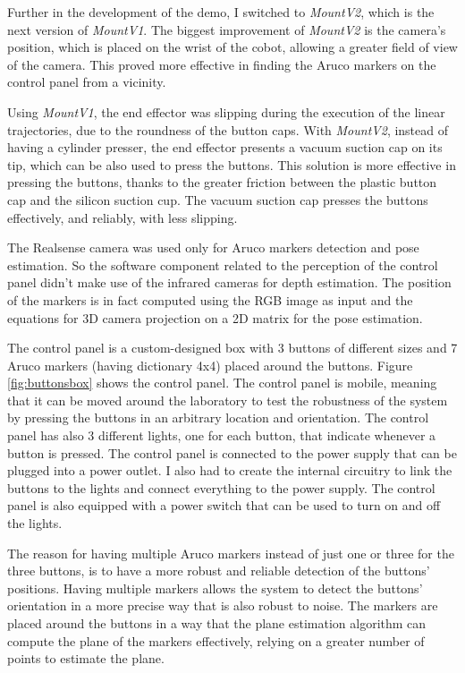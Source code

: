 Further in the development of the demo, I switched to \textit{MountV2}, which is the next version of \textit{MountV1}.
The biggest improvement of \textit{MountV2} is the camera's position, which is placed on the wrist of the cobot,
allowing a greater field of view of the camera. This proved more effective in finding the Aruco markers
on the control panel from a vicinity. 

Using \textit{MountV1}, the end effector was slipping during the execution of the linear trajectories, due to the
roundness of the button caps. With \textit{MountV2}, instead of having a cylinder presser, 
the end effector presents a vacuum suction cap on its tip, which can be also used to press the buttons. 
This solution is more effective in pressing the buttons, thanks to the greater friction between the plastic
button cap and the silicon suction cup. The vacuum suction cap presses the buttons effectively,
and reliably, with less slipping.

The Realsense camera was used only for Aruco markers detection and pose estimation. So the software
component related to the perception of the control panel didn't make use of the infrared cameras for 
depth estimation. The position of the markers is in fact computed using the RGB image as input and
the equations for 3D camera projection on a 2D matrix for the pose estimation.

The control panel is a custom-designed box with 3 buttons of different sizes and 7 Aruco markers
(having dictionary 4x4) placed around the buttons. Figure \ref{fig:buttonsbox} shows the control panel.
The control panel is mobile, meaning that it can be moved
around the laboratory to test the robustness of the system by pressing the buttons in an 
arbitrary location and orientation. The control panel has also 3 different lights, one for each button,
that indicate whenever a button is pressed. The control panel is connected to the power supply that 
can be plugged into a power outlet. I also had to create the internal circuitry to link the buttons
to the lights and connect everything to the power supply. The control panel is also equipped with
a power switch that can be used to turn on and off the lights.

The reason for having multiple Aruco markers instead of just one or three for the three buttons,
is to have a more robust and reliable detection of the buttons' positions. Having multiple markers
allows the system to detect the buttons' orientation in a more precise way that is also robust to noise.
The markers are placed around the buttons in a way that the plane estimation algorithm can compute
the plane of the markers effectively, relying on a greater number of points to estimate the plane.

